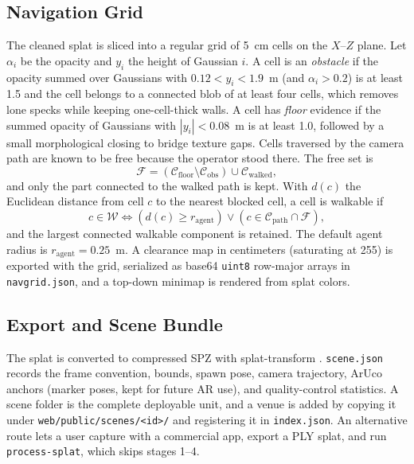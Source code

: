 \documentclass[conference]{IEEEtran}
\begin{document}
\subsection{Navigation Grid}
The cleaned splat is sliced into a regular grid of 5~cm cells on the $X$--$Z$ plane. Let $\alpha_i$ be the opacity and $y_i$ the height of Gaussian $i$. A cell is an \emph{obstacle} if the opacity summed over Gaussians with $0.12 < y_i < 1.9$~m (and $\alpha_i>0.2$) is at least 1.5 and the cell belongs to a connected blob of at least four cells, which removes lone specks while keeping one-cell-thick walls. A cell has \emph{floor} evidence if the summed opacity of Gaussians with $|y_i|<0.08$~m is at least 1.0, followed by a small morphological closing to bridge texture gaps. Cells traversed by the camera path are known to be free because the operator stood there. The free set is
\begin{equation}
\mathcal{F} = \left(\mathcal{C}_{\mathrm{floor}} \setminus \mathcal{C}_{\mathrm{obs}}\right) \cup \mathcal{C}_{\mathrm{walked}},
\end{equation}
and only the part connected to the walked path is kept. With $d(c)$ the Euclidean distance from cell $c$ to the nearest blocked cell, a cell is walkable if
\begin{equation}
c \in \mathcal{W} \iff \left( d(c) \ge r_{\mathrm{agent}} \right) \lor \left( c \in \mathcal{C}_{\mathrm{path}} \cap \mathcal{F} \right),
\end{equation}
and the largest connected walkable component is retained. The default agent radius is $r_{\mathrm{agent}} = 0.25$~m. A clearance map in centimeters (saturating at 255) is exported with the grid, serialized as base64 \texttt{uint8} row-major arrays in \texttt{navgrid.json}, and a top-down minimap is rendered from splat colors.

\subsection{Export and Scene Bundle}
The splat is converted to compressed SPZ with splat-transform \cite{splattransform,spz2025}. \texttt{scene.json} records the frame convention, bounds, spawn pose, camera trajectory, ArUco anchors (marker poses, kept for future AR use), and quality-control statistics. A scene folder is the complete deployable unit, and a venue is added by copying it under \texttt{web/public/scenes/<id>/} and registering it in \texttt{index.json}. An alternative route lets a user capture with a commercial app, export a PLY splat, and run \texttt{process-splat}, which skips stages 1--4.
\end{document}
